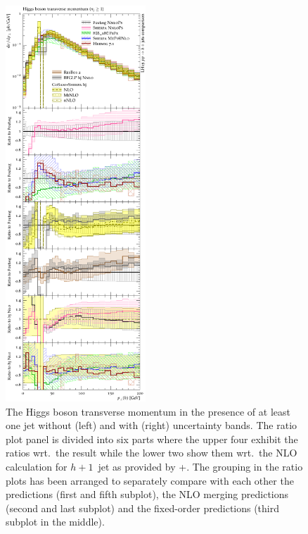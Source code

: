\begin{figure}[p!]
  \includegraphics[width=0.47\textwidth]{figures/hjetscomp_H_j_pT_incl.pdf}
  \caption{\label{fig:hjetscomp:results:1obs:hpt}%
    The Higgs boson transverse momentum in the presence of at least
    one jet without (left) and with (right) uncertainty bands. The
    ratio plot panel is divided into six parts where the upper four
    exhibit the ratios wrt.~the \Powheg \NNLOPS result while the lower
    two show them wrt.~the NLO calculation for $h+1$~jet as
    provided by \GoSam{}+\Sherpa. The grouping in the ratio plots has
    been arranged to separately compare with each other the \NNLOPS
    predictions (first and fifth subplot), the NLO merging
    predictions (second and last subplot) and the fixed-order
    predictions (third subplot in the middle).}
\end{figure}


